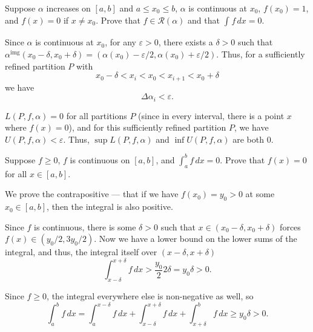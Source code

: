 \documentclass[12 pt, letterpaper]{hmcpset}
\begin{document}
\begin{problem}[1.]
	Suppose $\alpha$ increases on $[a, b]$ and  $a \le x_{0} \le b$, $\alpha$ is continuous at $x_{0}$, $f(x_{0}) = 1$, and $f(x) = 0$ if $x \neq x_{0}$. Prove that $f \in \mathscr{R}(\alpha)$ and that $\int_{}  f \, dx = 0$.
\end{problem}

\begin{solution}
	Since $\alpha$ is continuous at $x_{0}$, for any $\varepsilon > 0$, there exists a  $\delta > 0$ such that $\alpha^{\text{img}} (x_{0} - \delta, x_{0} + \delta) = (\alpha(x_{0}) - \varepsilon/2, \alpha(x_{0}) + \varepsilon/2)$. Thus, for a sufficiently refined partition $P$ with
	\[
		x_{0} - \delta < x_{i} < x_{0} < x_{i + 1} < x_{0} + \delta
	\]
	we have \[
		\Delta \alpha_{i} < \varepsilon.
	\]

	$L(P, f, \alpha) = 0$ for all partitions $P$ (since in every interval, there is a point $x$ where $f(x) = 0$), and for this sufficiently refined partition $P$, we have $U(P, f, \alpha) < \varepsilon$. Thus, $\sup L(P, f, \alpha)$ and $\inf U(P, f, \alpha)$ are both $0$.
\end{solution}

\pagebreak

\begin{problem}[2.]
	Suppose $f \ge 0$, $f$ is continuous on $[a, b]$, and $\int_{a}^{b} f \, dx = 0$. Prove that $f(x) = 0$ for all $x \in [a, b]$.
\end{problem}

\begin{solution}
	We prove the contrapositive --- that if we have $f(x_{0}) = y_{0} > 0$ at some $x_{0} \in [a, b]$, then the integral is also positive.

	Since $f$ is continuous, there is some $\delta > 0$ such that $x \in (x_{0} - \delta, x_{0} + \delta)$  forces $f(x) \in (y_{0}/2, 3 y_{0}/2)$. Now we have a lower bound on the lower sums of the integral, and thus, the integral itself over $(x - \delta, x + \delta)$
	\[
		\int_{x - \delta}^{x + \delta} f \, dx > \frac{y_{0}}{2} 2 \delta = y_{0} \delta > 0.
	\]

	Since $f \ge 0$, the integral everywhere else is non-negative as well, so
	\[
		\int_{a}^{b} f \, dx = \int_{a}^{x - \delta} f \, dx + \int_{x - \delta}^{x + \delta} f \, dx + \int_{x + \delta}^{b} f \, dx \ge y_{0} \delta > 0.
	\]
\end{solution}

\pagebreak
\end{document}
